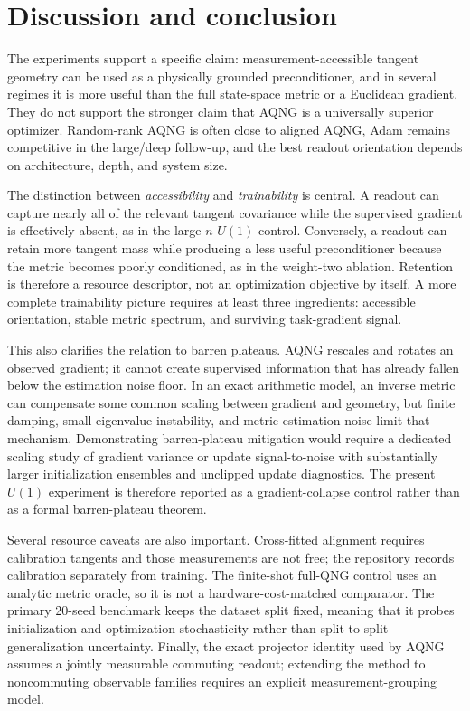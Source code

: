 \section{Discussion and conclusion}

The experiments support a specific claim: measurement-accessible tangent geometry can be used as a physically grounded preconditioner, and in several regimes it is more useful than the full state-space metric or a Euclidean gradient. They do not support the stronger claim that AQNG is a universally superior optimizer. Random-rank AQNG is often close to aligned AQNG, Adam remains competitive in the large/deep follow-up, and the best readout orientation depends on architecture, depth, and system size.

The distinction between \emph{accessibility} and \emph{trainability} is central. A readout can capture nearly all of the relevant tangent covariance while the supervised gradient is effectively absent, as in the large-$n$ $U(1)$ control. Conversely, a readout can retain more tangent mass while producing a less useful preconditioner because the metric becomes poorly conditioned, as in the weight-two ablation. Retention is therefore a resource descriptor, not an optimization objective by itself. A more complete trainability picture requires at least three ingredients: accessible orientation, stable metric spectrum, and surviving task-gradient signal.

This also clarifies the relation to barren plateaus. AQNG rescales and rotates an observed gradient; it cannot create supervised information that has already fallen below the estimation noise floor. In an exact arithmetic model, an inverse metric can compensate some common scaling between gradient and geometry, but finite damping, small-eigenvalue instability, and metric-estimation noise limit that mechanism. Demonstrating barren-plateau mitigation would require a dedicated scaling study of gradient variance or update signal-to-noise with substantially larger initialization ensembles and unclipped update diagnostics. The present $U(1)$ experiment is therefore reported as a gradient-collapse control rather than as a formal barren-plateau theorem.

Several resource caveats are also important. Cross-fitted alignment requires calibration tangents and those measurements are not free; the repository records calibration separately from training. The finite-shot full-QNG control uses an analytic metric oracle, so it is not a hardware-cost-matched comparator. The primary 20-seed benchmark keeps the dataset split fixed, meaning that it probes initialization and optimization stochasticity rather than split-to-split generalization uncertainty. Finally, the exact projector identity used by AQNG assumes a jointly measurable commuting readout; extending the method to noncommuting observable families requires an explicit measurement-grouping model.


